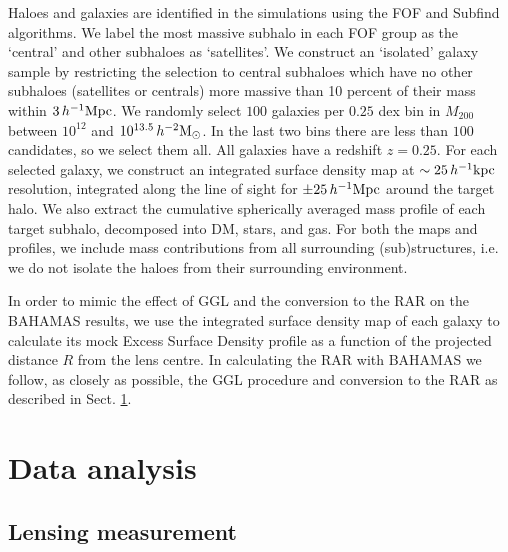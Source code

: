 \documentclass[usenatbib]{mnras}
\newcommand{\hmsun}{\,h^{-2} {\rm M_\odot}}
\newcommand{\hkpc}{\, h^{-1}{\rm{kpc}} }
\newcommand{\hMpc}{\, h^{-1}{\rm{Mpc}} }
\begin{document}
Haloes and galaxies are identified in the simulations using the FOF \citep{davis1985} and Subfind \citep{springel2001,dolag2009} algorithms. We label the most massive subhalo in each FOF group as the `central' and other subhaloes as `satellites'. We construct an `isolated' galaxy sample by restricting the selection to central subhaloes which have no other subhaloes (satellites or centrals) more massive than 10 percent of their mass within $3 \hMpc$. We randomly select $100$ galaxies per $0.25$ dex bin in $M_{200}$ between $10^{12}$ and $10^{13.5} \hmsun$. In the last two bins there are less than $100$ candidates, so we select them all. All galaxies have a redshift $z=0.25$. For each selected galaxy, we construct an integrated surface density map at $\sim 25\hkpc$ resolution, integrated along the line of sight for $\pm 25\hMpc$ around the target halo. We also extract the cumulative spherically averaged mass profile of each target subhalo, decomposed into DM, stars, and gas. For both the maps and profiles, we include mass contributions from all surrounding (sub)structures, i.e. we do not isolate the haloes from their surrounding environment.

In order to mimic the effect of GGL and the conversion to the RAR on the BAHAMAS results, we use the integrated surface density map of each galaxy to calculate its mock Excess Surface Density profile as a function of the projected distance $R$ from the lens centre. In calculating the RAR with BAHAMAS we follow, as closely as possible, the GGL procedure and conversion to the RAR as described in Sect. \ref{sec:analysis}.


\section{Data analysis}
\label{sec:analysis}

\subsection{Lensing measurement}
\label{sec:lensing}
\end{document}

